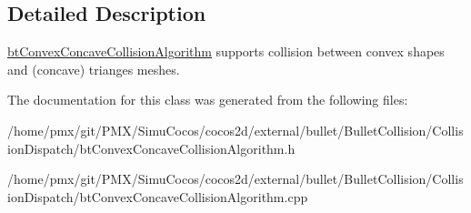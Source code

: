 \subsection{Detailed Description}
\hyperlink{classbtConvexConcaveCollisionAlgorithm}{bt\+Convex\+Concave\+Collision\+Algorithm} supports collision between convex shapes and (concave) trianges meshes. 

The documentation for this class was generated from the following files\+:\begin{DoxyCompactItemize}
\item 
/home/pmx/git/\+P\+M\+X/\+Simu\+Cocos/cocos2d/external/bullet/\+Bullet\+Collision/\+Collision\+Dispatch/bt\+Convex\+Concave\+Collision\+Algorithm.\+h\item 
/home/pmx/git/\+P\+M\+X/\+Simu\+Cocos/cocos2d/external/bullet/\+Bullet\+Collision/\+Collision\+Dispatch/bt\+Convex\+Concave\+Collision\+Algorithm.\+cpp\end{DoxyCompactItemize}
